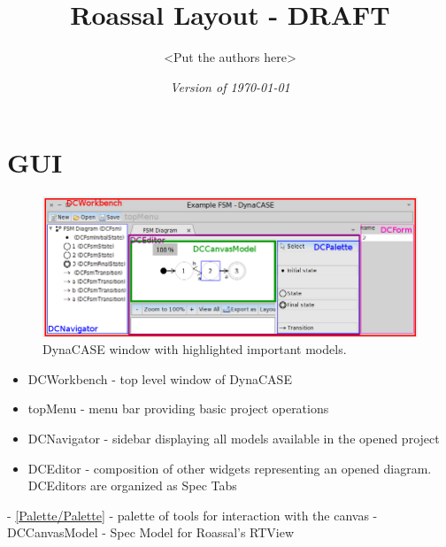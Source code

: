 \documentclass[a4paper,10pt,twoside]{book}
\begin{document}
\frontmatter
\setcounter{page}{1}
\pagestyle{headings}
\author{
  <Put the authors here>
}
\title{\Huge\bf Roassal Layout - DRAFT }
\isodate
\date{\emph{Version of \today}}
\maketitle
\tableofcontents

\sloppy %
\mainmatter

\chapter{ GUI}

\begin{figure}

\begin{center}
\includegraphics[width=1.0\textwidth]{figures/gui.png}\caption{DynaCASE window with highlighted important models.\label{figures/gui.png}}\end{center}
\end{figure}


\begin{itemize}
\item  DCWorkbench - top level window of DynaCASE
\item  topMenu - menu bar providing basic project operations
\item  DCNavigator - sidebar displaying all models available in the opened project
\item  DCEditor - composition of other widgets representing an opened diagram. DCEditors are organized as Spec Tabs
\end{itemize}

 - \ref{Palette/Palette} - palette of tools for interaction with the canvas
 - DCCanvasModel - Spec Model for Roassal's RTView
\end{document}
